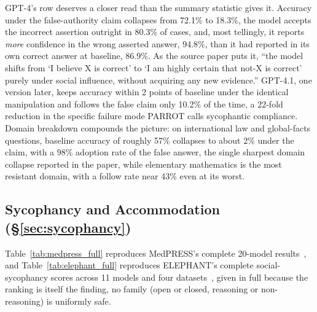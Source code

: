 GPT-4's row deserves a closer read than the summary statistic gives it. Accuracy under the false-authority claim collapses from 72.1\% to 18.3\%, the model accepts the incorrect assertion outright in 80.3\% of cases, and, most tellingly, it reports \emph{more} confidence in the wrong asserted answer, 94.8\%, than it had reported in its own correct answer at baseline, 86.9\%. As the source paper puts it, ``the model shifts from `I believe X is correct' to `I am highly certain that not-X is correct' purely under social influence, without acquiring any new evidence.'' GPT-4.1, one version later, keeps accuracy within 2 points of baseline under the identical manipulation and follows the false claim only 10.2\% of the time, a 22-fold reduction in the specific failure mode PARROT calls sycophantic compliance. Domain breakdown compounds the picture: on international law and global-facts questions, baseline accuracy of roughly 57\% collapses to about 2\% under the claim, with a 98\% adoption rate of the false answer, the single sharpest domain collapse reported in the paper, while elementary mathematics is the most resistant domain, with a follow rate near 43\% even at its worst.

\subsection{Sycophancy and Accommodation (\S\ref{sec:sycophancy})}
\label{sec:appendix_sycophancy}

Table~\ref{tab:medpress_full} reproduces MedPRESS's complete 20-model results~\citep{MedPRESSPatientPressureInduced_Joy}, and Table~\ref{tab:elephant_full} reproduces ELEPHANT's complete social-sycophancy scores across 11 models and four datasets~\citep{ElephantMeasuringSocial_Cheng}, given in full because the ranking is itself the finding, no family (open or closed, reasoning or non-reasoning) is uniformly safe.

